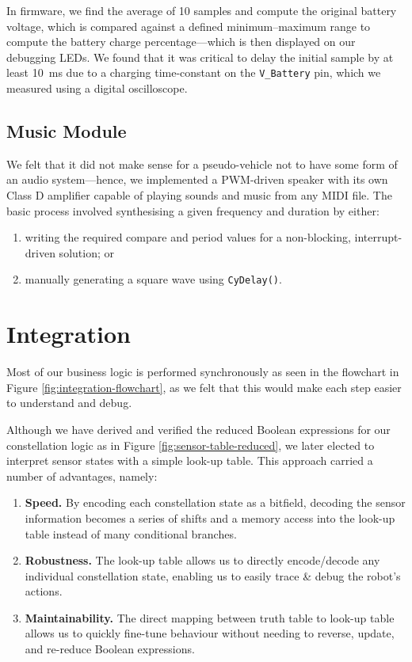 \documentclass[conference]{IEEEtran}
\begin{document}
In firmware, we find the average of 10 samples and compute the original battery voltage, which is compared against a defined minimum–maximum range to compute the battery charge percentage—which is then displayed on our debugging LEDs.
We found that it was critical to delay the initial sample by at least \qty{10}{\ms} due to a charging time-constant on the \texttt{V\_Battery} pin, which we measured using a digital oscilloscope.

\subsection{Music Module}

We felt that it did not make sense for a pseudo-vehicle not to have some form of an audio system—hence, we implemented a PWM-driven speaker with its own Class D amplifier capable of playing sounds and music from any MIDI file.
The basic process involved synthesising a given frequency and duration by either:
\begin{enumerate}
	\item writing the required compare and period values for a non-blocking, interrupt-driven solution; or
	\item manually generating a square wave using \texttt{CyDelay()}.
\end{enumerate}



\section{Integration}

Most of our business logic is performed synchronously as seen in the flowchart in Figure \ref{fig:integration-flowchart}, as we felt that this would make each step easier to understand and debug.

Although we have derived and verified the reduced Boolean expressions for our constellation logic as in Figure \ref{fig:sensor-table-reduced}, we later elected to interpret sensor states with a simple look-up table.
This approach carried a number of advantages, namely:
\begin{enumerate}
	\item \textbf{Speed.} By encoding each constellation state as a bitfield, decoding the sensor information becomes a series of shifts and a memory access into the look-up table instead of many conditional branches.
	\item \textbf{Robustness.} The look-up table allows us to directly encode/decode any individual constellation state, enabling us to easily trace \& debug the robot's actions.
	\item \textbf{Maintainability.} The direct mapping between truth table to look-up table allows us to quickly fine-tune behaviour without needing to reverse, update, and re-reduce Boolean expressions.
\end{enumerate}
\end{document}

